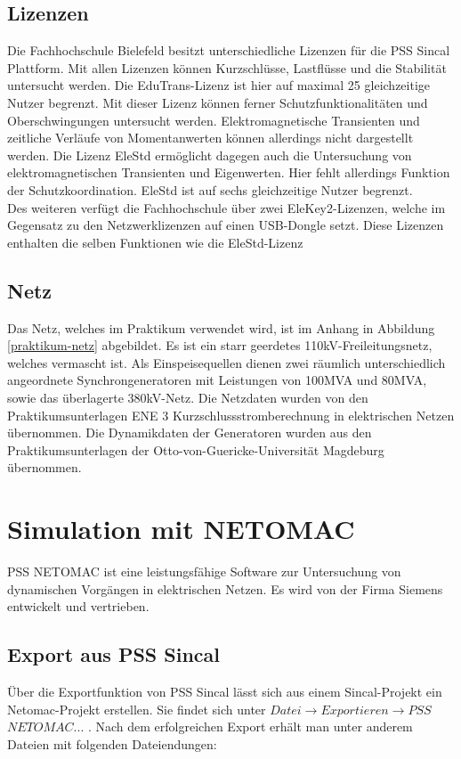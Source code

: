 \documentclass{scrartcl}
\begin{document}
\begin{onehalfspace}
\subsection{Lizenzen}
Die Fachhochschule Bielefeld besitzt unterschiedliche Lizenzen für die PSS Sincal Plattform. Mit allen Lizenzen können Kurzschlüsse, Lastflüsse und die Stabilität untersucht werden. Die EduTrans-Lizenz ist hier auf maximal 25 gleichzeitige Nutzer begrenzt. Mit dieser Lizenz können ferner Schutzfunktionalitäten und Oberschwingungen untersucht werden. Elektromagnetische Transienten und zeitliche Verläufe von Momentanwerten können allerdings nicht dargestellt werden. Die Lizenz EleStd ermöglicht dagegen auch die Untersuchung von elektromagnetischen Transienten und Eigenwerten. Hier fehlt allerdings Funktion der Schutzkoordination. EleStd ist auf sechs gleichzeitige Nutzer begrenzt. \\
Des weiteren verfügt die Fachhochschule über zwei EleKey2-Lizenzen, welche im Gegensatz zu den Netzwerklizenzen auf einen USB-Dongle setzt. Diese Lizenzen enthalten die selben Funktionen wie die EleStd-Lizenz

\subsection{Netz}
Das Netz, welches im Praktikum verwendet wird, ist im Anhang in Abbildung \ref{praktikum-netz} abgebildet. Es ist ein starr geerdetes 110kV-Freileitungsnetz, welches vermascht ist. Als Einspeisequellen dienen zwei räumlich unterschiedlich angeordnete Synchrongeneratoren mit Leistungen von 100MVA und 80MVA, sowie das überlagerte 380kV-Netz. Die Netzdaten wurden von den Praktikumsunterlagen \glqq ENE 3 Kurzschlussstromberechnung in elektrischen Netzen\grqq{} übernommen. Die Dynamikdaten der Generatoren wurden aus den Praktikumsunterlagen der Otto-von-Guericke-Universität Magdeburg übernommen.

\section{Simulation mit NETOMAC}
PSS NETOMAC ist eine leistungsfähige Software zur Untersuchung von dynamischen Vorgängen in elektrischen Netzen. Es wird von der Firma Siemens entwickelt und vertrieben.

\subsection{Export aus PSS Sincal}
Über die Exportfunktion von PSS Sincal lässt sich aus einem Sincal-Projekt ein Netomac-Projekt erstellen. Sie findet sich unter $Datei \rightarrow Exportieren \rightarrow PSS$ $NETOMAC...$ .  Nach dem erfolgreichen Export erhält man unter anderem  Dateien mit folgenden Dateiendungen:


\end{onehalfspace}
\end{document}
